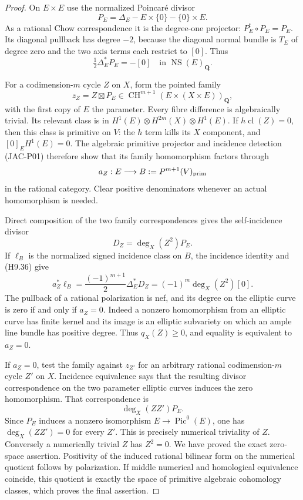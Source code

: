 \documentclass[11pt,a4paper]{article}
\begin{document}
\begin{proof}
On $E\times E$ use the normalized Poincar\'e divisor
\[
 P_E=\Delta_E-E\times\{0\}-\{0\}\times E.
\]
As a rational Chow correspondence it is the degree-one projector:
$P_E^t\circ P_E=P_E$. Its diagonal pullback has degree $-2$,
because the diagonal normal bundle is $T_E$ of degree zero and the
two axis terms each restrict to $[0]$. Thus
\[
 \tfrac12\Delta_E^*P_E=-[0]
       \quad\text{in }\operatorname{NS}(E)_{\mathbf Q}.       \tag{H9.36}
\]

For a codimension-$m$ cycle $Z$ on $X$, form the pointed family
\[
 z_Z=Z\boxtimes P_E
    \in\operatorname{CH}^{m+1}(E\times(X\times E))_{\mathbf Q},
\]
with the first copy of $E$ the parameter. Every fibre difference is
algebraically trivial. Its relevant class is in
$H^1(E)\otimes H^{2m}(X)\otimes H^1(E)$.
If $h\operatorname{cl}(Z)=0$, then this class is primitive on $V$:
the $h$ term kills its $X$ component, and $[0]_E H^1(E)=0$.
The algebraic primitive projector and incidence detection (JAC-P01)
therefore show that its family homomorphism factors through
\[
 a_Z:E\longrightarrow B:=P^{m+1}(V)_{\rm prim}
\]
in the rational category. Clear positive denominators whenever an
actual homomorphism is needed.

Direct composition of the two family correspondences gives the
self-incidence divisor
\[
 D_Z=\deg_X(Z^2)P_E.
\]
If $\ell_B$ is the normalized signed incidence class on $B$, the
incidence identity and (H9.36) give
\[
 a_Z^*\ell_B
   =\frac{(-1)^{m+1}}2\Delta_E^*D_Z
   =(-1)^m\deg_X(Z^2)[0].                                  \tag{H9.37}
\]
The pullback of a rational polarization is nef, and its degree on
the elliptic curve is zero if and only if $a_Z=0$. Indeed a nonzero
homomorphism from an elliptic curve has finite kernel and its image
is an elliptic subvariety on which an ample line bundle has positive
degree. Thus $q_X(Z)\ge0$, and equality is equivalent to $a_Z=0$.

If $a_Z=0$, test the family against $z_{Z'}$ for an arbitrary rational
codimension-$m$ cycle $Z'$ on $X$. Incidence equivalence says that
the resulting divisor correspondence on the two parameter elliptic
curves induces the zero homomorphism. That correspondence is
\[
 \deg_X(ZZ')P_E.
\]
Since $P_E$ induces a nonzero isomorphism $E\to\operatorname{Pic}^0(E)$,
one has $\deg_X(ZZ')=0$ for every $Z'$. This is precisely numerical
triviality of $Z$. Conversely a numerically trivial $Z$ has $Z^2=0$.
We have proved the exact zero-space assertion. Positivity of the
induced rational bilinear form on the numerical quotient follows by
polarization. If middle numerical and homological equivalence coincide,
this quotient is exactly the space of primitive algebraic cohomology
classes, which proves the final assertion.
\end{proof}
\end{document}
